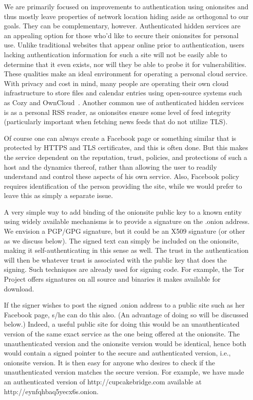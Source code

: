 \documentclass[10pt, conference, compsocconf]{styles/IEEEtran}
\begin{document}
We are primarily focused on improvements to authentication using
onionsites and thus mostly leave properties of network location hiding
aside as orthogonal to our goals. They can be complementary, however.
Authenticated hidden services are an appealing option for those
who'd like to secure their onionsites for personal use.  Unlike
traditional websites that appear online prior to authentication,
users lacking authentication information for such a site will not be
easily able to
determine that it even exists, nor will they be able to probe it
for vulnerabilities.  These qualities make an ideal environment for
operating a personal cloud service.  With privacy and cost in mind,
many people are operating their own cloud infrastructure to store
files and calendar entries using open-source systems such as Cozy and
OwnCloud~\cite{cozy}.  Another common use of authenticated hidden
services is as  a personal RSS reader, as onionsites ensure some level
of feed integrity (particularly important when fetching news feeds
that do not utilize TLS).

Of course one can always create a Facebook page or something similar
that is protected by HTTPS and TLS certificates,
and this is often done.  But this makes the service dependent on the
reputation, trust, policies, and protections of such a host and the
dynamics thereof, rather than allowing the user to readily understand
and control these aspects of his own service. Also, Facebook
policy requires identification of the person providing the site,
while we would prefer to leave this as simply a separate issue.

A very simple way to add binding of the onionsite public key to
a known entity using widely available mechanisms is to provide a
signature on the .onion address. We envision a PGP/GPG signature, but
it could be an X509 signature (or other as we discuss below). 
The signed text can simply be
included on the onionsite, making it self-authenticating in this sense
as well. The trust in the authentication will then be whatever trust
is associated with the public key that does the signing. Such
techniques are already used for signing code. For example,
the Tor Project offers signatures on all source and binaries
it makes available for download. 

If the signer wishes to post the signed .onion address to a public
site such as her Facebook page, s/he can do this also. (An advantage
of doing so will be discussed below.) Indeed, a
useful public site for doing this would be an unauthenticated version
of the same exact service as the one being offered at the onionsite.
The unauthenticated version and the onionsite version would be
identical, hence both would contain a signed pointer to the secure and
authenticated version, i.e., onionsite version. It is then
easy for anyone who desires to check if the unauthenticated version
matches the secure version. For example, we have made an authenticated
version of http://cupcakebridge.com available at http://eynfqhbaq5yecx6s.onion.
\end{document}
